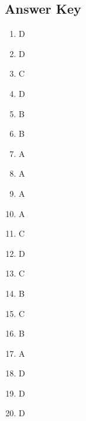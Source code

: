 \documentclass[
]{book}
\providecommand{\tightlist}{%
  \setlength{\itemsep}{0pt}\setlength{\parskip}{0pt}}
\begin{document}
\hypertarget{answer-key-1}{%
\subsection{Answer Key}\label{answer-key-1}}

\begin{enumerate}
\def\labelenumi{\arabic{enumi}.}
\tightlist
\item
  D
\item
  D
\item
  C
\item
  D
\item
  B
\item
  B
\item
  A
\item
  A
\item
  A
\item
  A
\item
  C
\item
  D
\item
  C
\item
  B
\item
  C
\item
  B
\item
  A
\item
  D
\item
  D
\item
  D
\end{enumerate}
\end{document}
